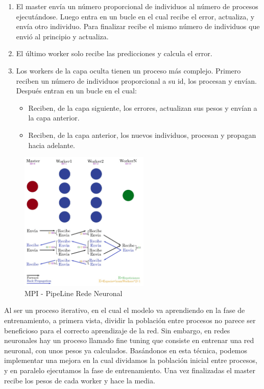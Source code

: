 	\begin{enumerate}
		\item El master envía un número proporcional de individuos al número de procesos ejecutándose. Luego entra en un bucle en el cual recibe el error, actualiza, y envía otro individuo. Para finalizar recibe el mismo número de individuos que envió al principio y actualiza.
		\item El último worker solo recibe las predicciones y calcula el error.
		\item Los workers de la capa oculta tienen un proceso más complejo. Primero reciben un número de individuos proporcional a su id, los procesan y envían. Después entran en un bucle en el cual:			
		\begin{itemize}
			\item Reciben, de la capa siguiente, los errores, actualizan sus pesos y envían a la capa anterior.			
			\item Reciben, de la capa anterior, los nuevos individuos, procesan y propagan hacia adelante.
		\end{itemize}		
		
	\end{enumerate}
	
	\begin{figure}[!h]
		\centering
		\includegraphics[width=0.55\textwidth]{images/chapter_3/redneu_mpi2}
		\caption{MPI - PipeLine Rede Neuronal}
		\label{fig:redneumpipipe}
	\end{figure}
	
	Al ser un proceso iterativo, en el cual el modelo va aprendiendo en la fase de entrenamiento, a primera vista, dividir la población entre procesos no parece ser beneficioso para el correcto aprendizaje de la red. Sin embargo, en redes neuronales hay un proceso llamado fine tuning \cite{malladi2023fine} que consiste en entrenar una red neuronal, con unos pesos ya calculados. Basándonos en esta técnica, podemos implementar una mejora en la cual dividamos la población inicial entre procesos, y en paralelo ejecutamos la fase de entrenamiento. Una vez finalizadas el master recibe los pesos de cada worker y hace la media. 
	
